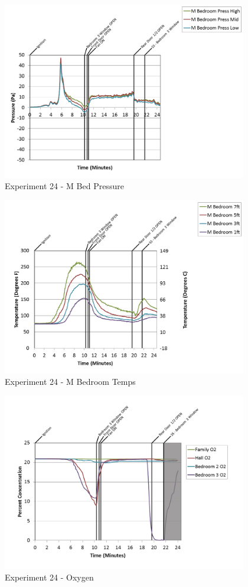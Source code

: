 \documentclass{article}
\begin{document}
\begin{appendices}
\clearpage

\begin{figure}[h!]
	\centering
	\includegraphics[height=3.05in]{0_Images/Results_Charts/Exp_24_Charts/MBedPressure.png}
	\caption{Experiment 24 - M Bed Pressure}
\end{figure}


\begin{figure}[h!]
	\centering
	\includegraphics[height=3.05in]{0_Images/Results_Charts/Exp_24_Charts/MBedroomTemps.png}
	\caption{Experiment 24 - M Bedroom Temps}
\end{figure}

\clearpage

\begin{figure}[h!]
	\centering
	\includegraphics[height=3.05in]{0_Images/Results_Charts/Exp_24_Charts/Oxygen.png}
	\caption{Experiment 24 - Oxygen}
\end{figure}



\end{appendices}
\end{document}
